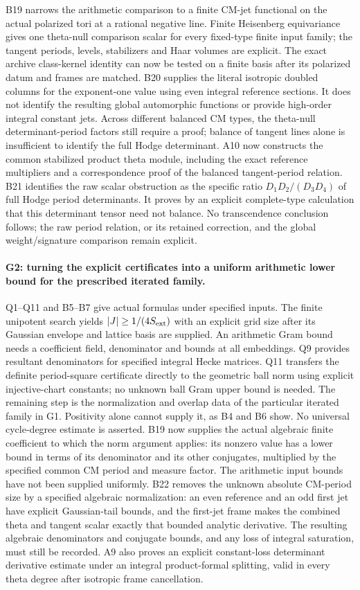 \documentclass[11pt]{article}
\theoremstyle{definition}\newtheorem{definition}[theorem]{Definition}\newtheorem{remark}[theorem]{Remark}
\begin{document}
B19 narrows the arithmetic comparison to a finite CM-jet
functional on the actual polarized tori at a rational negative
line. Finite Heisenberg equivariance gives one theta-null
comparison scalar for every fixed-type finite input family;
the tangent periods, levels, stabilizers and Haar volumes are
explicit. The exact archive class-kernel identity can now be
tested on a finite basis after its polarized datum and frames
are matched. B20 supplies the literal isotropic doubled columns
for the exponent-one value using even integral reference sections.
It does not identify the resulting global automorphic functions
or provide high-order integral constant jets. Across different
balanced CM types, the theta-null determinant-period factors
still require a proof; balance of tangent lines alone is
insufficient to identify the full Hodge determinant.
A10 now constructs the common stabilized product theta module,
including the exact reference multipliers and a correspondence
proof of the balanced tangent-period relation. B21 identifies
the raw scalar obstruction as the specific ratio
$D_1D_2/(D_3D_4)$ of full Hodge period determinants. It proves
by an explicit complete-type calculation that this determinant
tensor need not balance. No transcendence conclusion follows;
the raw period relation, or its retained correction, and the
global weight/signature comparison remain explicit.

\paragraph{G2: turning the explicit certificates into a uniform
arithmetic lower bound for the prescribed iterated family.}
Q1--Q11 and B5--B7 give actual formulas under specified inputs.
The finite unipotent search yields $|J|\geq1/(4S_{\rm ext})$ with
an explicit grid size after its Gaussian envelope and lattice basis
are supplied. An arithmetic Gram bound needs a coefficient field,
denominator and bounds at all embeddings. Q9 provides resultant
denominators for specified integral Hecke matrices. Q11 transfers
the definite period-square certificate directly to the geometric
ball norm using explicit injective-chart constants; no unknown
ball Gram upper bound is needed. The remaining
step is the normalization and overlap data of the particular
iterated family in G1. Positivity alone cannot supply it, as B4
and B6 show. No universal cycle-degree estimate is asserted.
B19 now supplies the actual algebraic finite coefficient to
which the norm argument applies: its nonzero value has a lower
bound in terms of its denominator and its other conjugates,
multiplied by the specified common CM period and measure factor.
The arithmetic input bounds have not been supplied uniformly.
B22 removes the unknown absolute CM-period size by a specified
algebraic normalization: an even reference and an odd first jet
have explicit Gaussian-tail bounds, and the first-jet frame
makes the combined theta and tangent scalar exactly that
bounded analytic derivative. The resulting algebraic
denominators and conjugate bounds, and any loss of integral
saturation, must still be recorded. A9 also proves an explicit
constant-loss determinant derivative estimate under an integral
product-formal splitting, valid in every theta degree after
isotropic frame cancellation.
\end{document}
